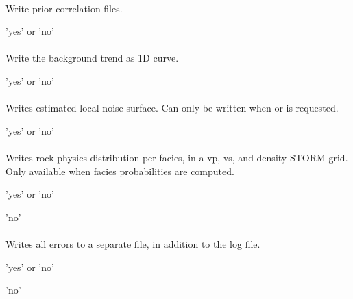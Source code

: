 \paragraph{}
 \slist
   \item \Description Write prior correlation files.
   \item \Argument 'yes' or 'no'
   \item \Default
 \elist

\paragraph{}
 \slist
   \item \Description Write the background trend as 1D curve.
   \item \Argument 'yes' or 'no'
   \item \Default
 \elist

\paragraph{}
 \slist
   \item \Description Writes estimated local noise surface. Can only be written when  or  is requested.
   \item \Argument 'yes' or 'no'
   \item \Default
 \elist

\paragraph{}
 \slist
   \item \Description Writes rock physics distribution per facies, in a vp, vs, and density STORM-grid. Only available when facies probabilities are computed.
   \item \Argument 'yes' or 'no'
   \item \Default 'no'
\elist

\paragraph{}
 \slist
   \item \Description Writes all errors to a separate file, in
   addition to the log file.
   \item \Argument 'yes' or 'no'
   \item \Default 'no'
\elist

